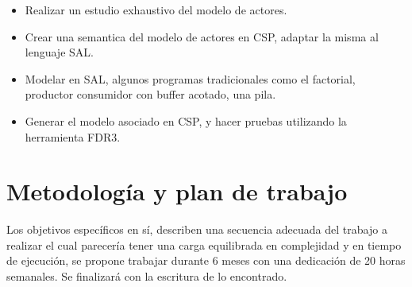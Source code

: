 \documentclass{article}
\begin{document}
\begin{itemize}

  \item Realizar un estudio exhaustivo del modelo de actores. 
  \item Crear una semantica del modelo de actores en CSP, adaptar la misma al lenguaje SAL.
  \item Modelar en SAL, algunos programas tradicionales como el factorial, productor consumidor con buffer acotado, una pila.
  \item Generar el modelo asociado en CSP, y hacer pruebas utilizando la herramienta FDR3.

\end{itemize}


\section{Metodología y plan de trabajo}

Los objetivos específicos en sí, describen una secuencia adecuada del trabajo a realizar el cual parecería tener una carga equilibrada en complejidad y en tiempo de ejecución, se propone trabajar durante 6 meses con una dedicación de 20 horas semanales. Se finalizará con la escritura de lo encontrado.

{}

\end{document}

